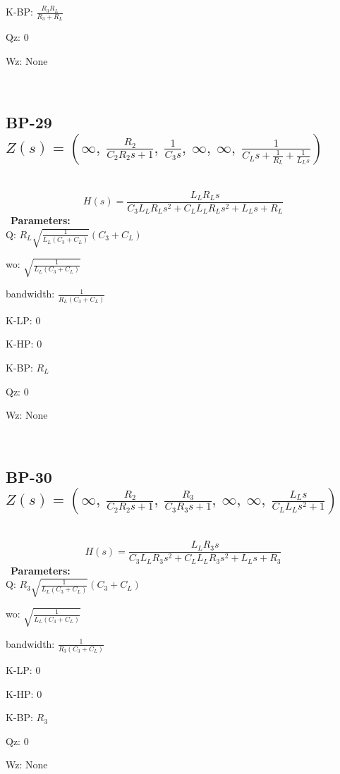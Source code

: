 \documentclass{article}
\begin{document}
K-BP: $\frac{R_{3} R_{L}}{R_{3} + R_{L}}$\ 

Qz: $0$\ 

Wz: $\text{None}$\ 

\ 

\subsection{BP-29 $Z(s) = \left( \infty, \  \frac{R_{2}}{C_{2} R_{2} s + 1}, \  \frac{1}{C_{3} s}, \  \infty, \  \infty, \  \frac{1}{C_{L} s + \frac{1}{R_{L}} + \frac{1}{L_{L} s}}\right)$ } \ 
\textbf{\[H(s) = \frac{L_{L} R_{L} s}{C_{3} L_{L} R_{L} s^{2} + C_{L} L_{L} R_{L} s^{2} + L_{L} s + R_{L}}\] } \ 
\textbf{Parameters:}\\ 

Q: $R_{L} \sqrt{\frac{1}{L_{L} \left(C_{3} + C_{L}\right)}} \left(C_{3} + C_{L}\right)$\ 

wo: $\sqrt{\frac{1}{L_{L} \left(C_{3} + C_{L}\right)}}$\ 

bandwidth: $\frac{1}{R_{L} \left(C_{3} + C_{L}\right)}$\ 

K-LP: $0$\ 

K-HP: $0$\ 

K-BP: $R_{L}$\ 

Qz: $0$\ 

Wz: $\text{None}$\ 

\ 

\subsection{BP-30 $Z(s) = \left( \infty, \  \frac{R_{2}}{C_{2} R_{2} s + 1}, \  \frac{R_{3}}{C_{3} R_{3} s + 1}, \  \infty, \  \infty, \  \frac{L_{L} s}{C_{L} L_{L} s^{2} + 1}\right)$ } \ 
\textbf{\[H(s) = \frac{L_{L} R_{3} s}{C_{3} L_{L} R_{3} s^{2} + C_{L} L_{L} R_{3} s^{2} + L_{L} s + R_{3}}\] } \ 
\textbf{Parameters:}\\ 

Q: $R_{3} \sqrt{\frac{1}{L_{L} \left(C_{3} + C_{L}\right)}} \left(C_{3} + C_{L}\right)$\ 

wo: $\sqrt{\frac{1}{L_{L} \left(C_{3} + C_{L}\right)}}$\ 

bandwidth: $\frac{1}{R_{3} \left(C_{3} + C_{L}\right)}$\ 

K-LP: $0$\ 

K-HP: $0$\ 

K-BP: $R_{3}$\ 

Qz: $0$\ 

Wz: $\text{None}$\ 
\end{document}

